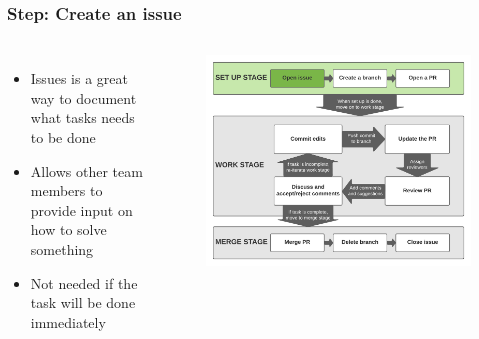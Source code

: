 \documentclass[aspectratio=169]{beamer} %
\begin{document}
\begin{frame}
	\frametitle{Step: Create an issue}
	\begin{columns}[c]
		
		\begin{itemize}
			\setlength\itemsep{1em}
			\item Issues is a great way to document what tasks needs to be done
			\item Allows other team members to provide input on how to solve something
			\item Not needed if the task will be done immediately
		\end{itemize}
		
		\vspace{-.75cm}
		\begin{figure}
			\centering
			\includegraphics[width=\textwidth]{./img/branch-pr-merge-cycle-S1-1.png}
		\end{figure}
		
	\end{columns}
\end{frame}
\end{document}
